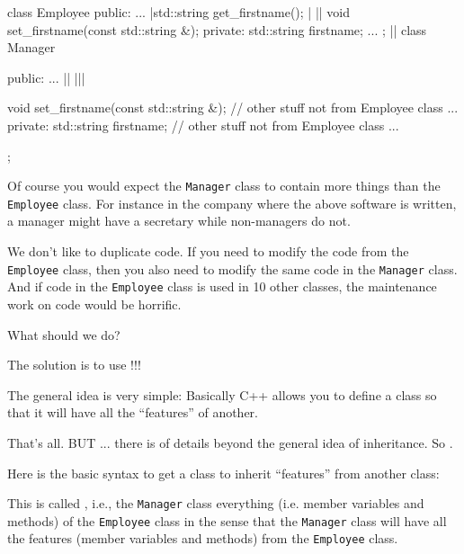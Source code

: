 \begin{consolethree}[escapeinside=||]
class Employee
{
public:
        ...
        |std::string get\_firstname();                |                ||
        void set_firstname(const std::string &);
private:
        std::string firstname;
        ...
};
||
class Manager
{
public:
        ...
        ||                 |||
        
        void set_firstname(const std::string &);
        // other stuff not from Employee class
        ...
private:
        std::string firstname;
        // other stuff not from Employee class
        ...
}; 
\end{consolethree}
Of course you would expect the \texttt{Manager} class to contain more
things than the \texttt{Employee} class. For instance in the company where
the above software is written, a manager might have a secretary while
non-managers do not.

We don't like to duplicate code. If you need to modify the code from the
\texttt{Employee} class, then you also need to modify the same code in the
\texttt{Manager} class. And if code in the \texttt{Employee} class is used
in 10 other classes, the maintenance work on code would be horrific.

What should we do?

\newpage{}

The solution is to use !!!

The general idea is very simple: Basically C++ allows you to define a
class so that it will have all the ``features'' of another.

That's all. BUT ... there is  of details beyond the
general idea of inheritance. So .

Here is the basic syntax to get a class to inherit ``features'' from
another class:

This is called , i.e., the \texttt{Manager}
class  everything (i.e. member variables and methods)
of the \texttt{Employee} class in the sense that the \texttt{Manager} class
will have all the features (member variables and methods) from the
\texttt{Employee} class.

